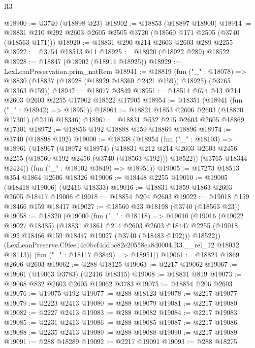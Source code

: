 \begin{lexlean}{R3}
\begin{coremodule}
@18900 := @3740 (@18898 @23)
@18902 := @18853 (@18897 @18900)
@18914 := @18831 @210 @292 @2603 @2605 @2505 @3720 (@18560 @171 @2505 (@3740 (@18563 @171)))
@18920 := @18831 @290 @214 @2603 @2603 @289 @2255
@18922 := @3754 @18513 @11
@18925 := @18920 (@18922 @289) @18522
@18928 := @18847 (@18902 (@18914 @18925))
@18929 := LexLeanPreservation.prim_natRem
@18941 := @18819
    (fun ("_" : @18078) =>
    @18830 (@18837 (@18928 (@18929 @18360 @2421 @159)) @18925) (@3765 @18363 @159))
@18942 := @18077 @3849
@18951 := @18514 @674 @13 @214 @2603 @2603 @2255 @17902 @18522 @17905
@18954 := @18351 (@18941 (fun ("_" : @18942) => @18951))
@18961 := @18821 @1853 @2606 @2603 (@18870 @17301) (@2416 @18346)
@18967 := @18831 @532 @215 @2603 @2605 @18869 @17301
@18972 := @18856 @192 @18888 @159 @18869 @18896
@18974 := @3740 (@18898 @192)
@19000 := @18338
    (@18954
      (fun ("_" : @18103) =>
      @18961
        (@18967
          (@18972 @18974)
          (@18831
            @212
            @214
            @2603
            @2603
            @2456
            @2255
            (@18560 @192 @2456 (@3740 (@18563 @192)))
            @18522))
        (@3765 @18344 @2424))
      (fun ("_" : @18102 @3849) => @18951))
@19005 := @17273 @18513 @354 @1864 @2606 @18326
@19006 := @18448 @2255
@19010 := @19005 (@18418 @19006) (@2416 @18333)
@19016 := @18831 @1859 @1863 @2603 @2605 @18417 @19006
@19018 := @18854 @204 @2603
@19022 := @19018 @159 @18466 @159 @18417
@19027 := @18560 @23 @18198 (@3740 (@18563 @23))
@19058 := @18320
    (@19000
      (fun ("_" : @18118) =>
      @19010
        (@19016
          (@19022 @19027 @18485)
          (@18831
            @1861
            @214
            @2603
            @2603
            @18447
            @2255
            (@19018 @192 @18466 @159 @18447 @19027 (@3740 (@18483 @192)))
            @18522))
        (LexLeanPreserve.C9fee14c0bcf4ddbc82e20558ea8d0004.R3.__rel_12 @18032 @18113))
      (fun ("_" : @18117 @3849) => @18951))
@19061 := @18821 @1869 @2606 @2603
@19062 := @288 @18125
@19063 := @2217 @19062
@19067 := @19061 (@19063 @3783) (@2416 @18315)
@19068 := @18831 @819
@19073 := @19068 @832 @2603 @2605 @19062 @3783
@19075 := @18854 @206 @2603
@19076 := @19075 @192
@19077 := @288 @18123
@19078 := @2217 @19077
@19079 := @2223 @2413
@19080 := @288 @19079
@19081 := @2217 @19080
@19082 := @2227 @2413
@19083 := @288 @19082
@19084 := @2217 @19083
@19085 := @2231 @2413
@19086 := @288 @19085
@19087 := @2217 @19086
@19088 := @2235 @2413
@19089 := @288 @19088
@19090 := @2217 @19089
@19091 := @288 @18289
@19092 := @2217 @19091
@19093 := @288 @18275

\end{coremodule}
\end{lexlean}
